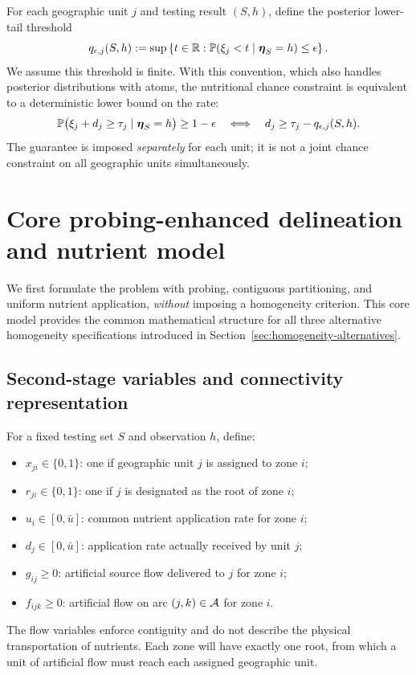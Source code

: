 For each geographic unit $j$ and testing result $(S,h)$, define the
posterior lower-tail threshold
\begin{equation}
 q_{\epsilon,j}(S,h)
 :=\sup\left\{t\in\mathbb R:
 \mathbb{P}(\xi_j<t\mid\boldsymbol{\eta}_S=h)\leq\epsilon\right\}.
 \label{eq:quantile-definition}
\end{equation}
We assume this threshold is finite. With this convention, which also
handles posterior distributions with atoms, the nutritional chance
constraint is equivalent to a deterministic lower bound on the rate:
\begin{equation}
\begin{aligned}
 \mathbb{P}\bigl(\xi_j+d_j\geq\tau_j\mid
     \boldsymbol{\eta}_S=h\bigr)\geq1-\epsilon
 \quad\Longleftrightarrow\quad
 d_j\geq\tau_j-q_{\epsilon,j}(S,h).
\end{aligned}
\label{eq:chance-equivalence}
\end{equation}
The guarantee is imposed \emph{separately} for each unit; it is not a
joint chance constraint on all geographic units simultaneously.

\section{Core probing-enhanced delineation and nutrient model}
\label{sec:core}

We first formulate the problem with probing, contiguous partitioning,
and uniform nutrient application, \emph{without} imposing a homogeneity
criterion. This core model provides the common mathematical structure
for all three alternative homogeneity specifications introduced in
Section~\ref{sec:homogeneity-alternatives}.

\subsection{Second-stage variables and connectivity representation}
\label{subsec:decisions}

For a fixed testing set $S$ and observation $h$, define:
\begin{itemize}
\item $x_{ji}\in\{0,1\}$: one if geographic unit $j$ is assigned to zone $i$;
\item $r_{ji}\in\{0,1\}$: one if $j$ is designated as the root of zone $i$;
\item $u_i\in[0,\bar u]$: common nutrient application rate for zone $i$;
\item $d_j\in[0,\bar u]$: application rate actually received by unit $j$;
\item $g_{ij}\geq0$: artificial source flow delivered to $j$ for zone $i$;
\item $f_{ijk}\geq0$: artificial flow on arc $(j,k)\in\mathcal{A}$ for zone $i$.
\end{itemize}
The flow variables enforce contiguity and do not describe the physical
transportation of nutrients. Each zone will have exactly one root, from
which a unit of artificial flow must reach each assigned geographic unit.

